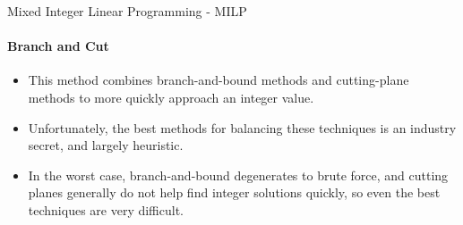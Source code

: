 \documentclass{beamer}
\begin{document}
%	
%	
	\begin{frame}{Mixed Integer Linear Programming - MILP}
		\framesubtitle{Branch and Cut}
		\begin{itemize}
			\item This method combines branch-and-bound methods and cutting-plane methods to more quickly approach an integer value.
			\item Unfortunately, the best methods for balancing these techniques is an industry secret, and largely heuristic.
			\item In the worst case, branch-and-bound degenerates to brute force, and cutting planes generally do not help find integer solutions quickly, so even the best techniques are very difficult.
		\end{itemize}
	\end{frame}
%	
\end{document}
